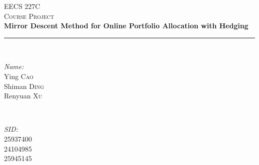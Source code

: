 \begin{titlepage}

\newcommand{\HRule}{\rule{\linewidth}{0.5mm}} %

\center %
 

\textsc{\LARGE EECS 227C}\\[1.0cm] %
\textsc{\Large Course Project}\\[2.0cm] %


\singlespacing \huge \textbf{Mirror Descent Method for Online Portfolio Allocation with Hedging}
\\[0.2cm] %
\HRule \\[2.0cm]
 

\begin{minipage}{0.4\textwidth}
\begin{flushleft} \large
\emph{Name:}\\
Ying \textsc{Cao}\\
Shiman \textsc{Ding}\\
Renyuan \textsc{Xu}
\end{flushleft}
\end{minipage}
~
\begin{minipage}{0.4\textwidth}
\begin{flushright} \large
\emph{SID:} \\
25937400\\
24104985\\
25945145
\end{flushright}
\end{minipage}\\[2.5cm]


\end{titlepage}
